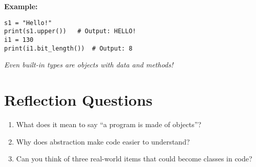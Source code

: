 \textbf{Example:}
\begin{verbatim}
s1 = "Hello!"
print(s1.upper())   # Output: HELLO!
i1 = 130
print(i1.bit_length())  # Output: 8
\end{verbatim}

\textit{Even built-in types are objects with data and methods!}

\section*{Reflection Questions}

\begin{enumerate}
  \item What does it mean to say “a program is made of objects”?
  \item Why does abstraction make code easier to understand?
  \item Can you think of three real-world items that could become classes in code?
\end{enumerate}


